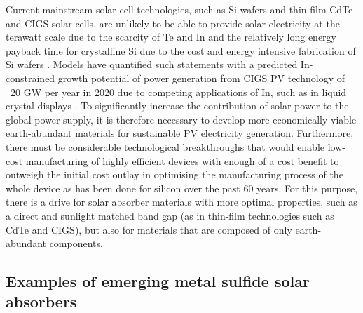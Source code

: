 \documentclass[11pt, twoside]{report}
\begin{document}

Current mainstream solar cell technologies, such as Si wafers and thin-film CdTe and CIGS solar cells, are unlikely to be able to provide solar electricity at the terawatt scale due to the scarcity of Te and In and the relatively long energy payback time for crystalline Si due to the cost and energy intensive fabrication of Si wafers \cite{CZTS_vs_MAPI}. 
Models have quantified such statements with a predicted In-constrained growth potential of power generation from CIGS PV technology of ~20 GW per year in 2020 due to competing applications of In, such as in liquid crystal displays \cite{culprit_5_3}.
To significantly increase the contribution of solar power to the global power supply, it is therefore necessary to develop more economically viable earth-abundant materials for sustainable PV electricity generation. Furthermore, there must be considerable technological breakthroughs that would enable low-cost manufacturing of highly efficient devices with enough of a cost benefit to outweigh the initial cost outlay in optimising the manufacturing process of the whole device as has been done for silicon over the past 60 years. For this purpose, there is a drive for solar absorber materials with more optimal properties, such as a direct and sunlight matched band gap (as in thin-film technologies such as CdTe and CIGS), but also for materials that are composed of only earth-abundant components.\\


\subsection{Examples of emerging metal sulfide solar absorbers}
\end{document}

